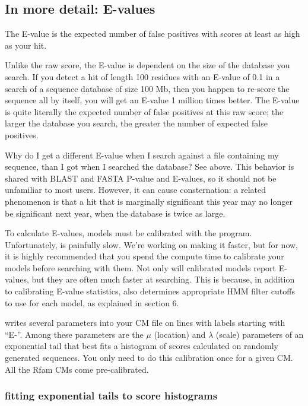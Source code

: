 \subsection{In more detail:  E-values}

The E-value is the expected number of false positives with scores at
least as high as your hit.

Unlike the raw score, the E-value is dependent on the size of the
database you search. If you detect a hit of length 100 residues 
with an E-value of 0.1 in a search of a sequence database of size 100
Mb, then you happen to re-score the sequence all by itself, you will
get an E-value 1 million times better. The E-value is quite literally
the expected number of false positives at this raw score; the larger
the database you search, the greater the number of expected false
positives.

\begin{srefaq}{Why do I get a different E-value when I search
against a file containing my sequence, than I got when I searched the
database?} See above. This behavior is shared with BLAST and FASTA
P-value and E-values, so it should not be unfamiliar to most users.
However, it can cause consternation: a related phenomenon is that a
hit that is marginally significant this year may no longer be
significant next year, when the database is twice as large. 
\end{srefaq}

To calculate E-values, models must be calibrated with the
 program. Unfortunately,  is
painfully slow. We're working on making it faster, but for now, it is
highly recommended that you spend the compute time to calibrate your
models before searching with them. Not only will calibrated models
report E-values, but they are often much faster at searching. This is
because, in addition to calibrating E-value statistics, 
also determines appropriate HMM filter cutoffs to use for each model, as
explained in section 6.

 writes several parameters into your CM file on
lines with labels starting with ``E-''. Among these parameters are the
$\mu$ (location) and $\lambda$ (scale) parameters of an exponential
tail that best fits a histogram of scores calculated on randomly
generated sequences. You only need to do this calibration once
for a given CM. All the Rfam CMs come pre-calibrated.

\subsubsection{fitting exponential tails to  score histograms}

